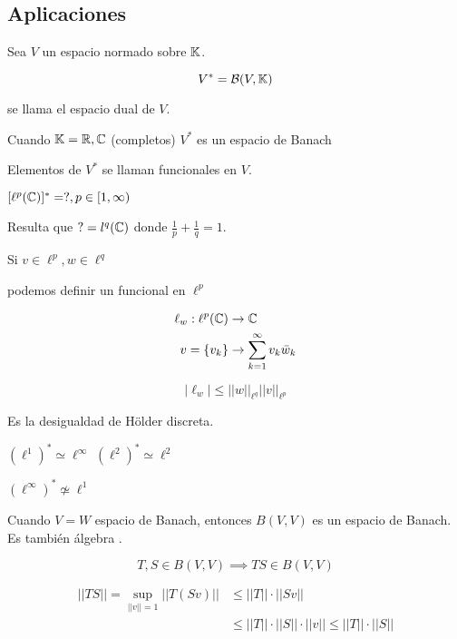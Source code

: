     \subsection{Aplicaciones}

    \begin{fdefinition}
        Sea $V$ un espacio normado sobre $\mathbb{K}$.

        \[V^*=\mathcal{B}(V,\mathbb{K})\]

        se llama el espacio \color{red} dual \color{black} de $V$.
    \end{fdefinition}

    \begin{ftheorem}
        Cuando $\mathbb{K}=\mathbb{R},\mathbb{C}$ (completos) $V^*$ es un espacio de Banach
    \end{ftheorem}

    Elementos de $V^*$ se llaman \color{red} funcionales \color{black} en $V$.


    \begin{fexample}
        $[\ell^p(\mathbb{C})]^* =?,p\in[1,\infty)$

        Resulta que $?=l^q(\mathbb{C})$ donde $\frac{1}{p}+\frac{1}{q}=1$.

        Si $v\in \ell^p,w\in\ell^q$

        podemos definir un funcional en $\ell^p$

        \begin{align*}\ell_w:\ell^p(\mathbb{C})&\to\mathbb{C}\\
        v=\{v_k\}&\to \sum_{k=1}^\infty v_k\bar w_k\end{align*}

        \[|\ell_w|\leq ||w||_{\ell^q}||v||_{\ell^p}\]

        Es la desigualdad de Hölder discreta.
    \end{fexample}

    $(\ell^1)^*\simeq \ell^\infty$
    $(\ell^2)^*\simeq \ell^2$

    \begin{fnote}
        $(\ell^\infty)^*\not\simeq \ell^1$
    \end{fnote}

Cuando $V=W$ espacio de Banach, entonces $B(V,V)$ es un espacio de Banach. Es también \color{red} álgebra \color{black}.

\[T,S\in B(V,V)\implies TS\in B(V,V)\]

\begin{align*}
    ||TS||=\sup_{||v||=1} ||T(Sv)||&\leq ||T||\cdot ||Sv||\\
    &\leq ||T||\cdot ||S||\cdot ||v||\leq ||T||\cdot ||S||
\end{align*}


